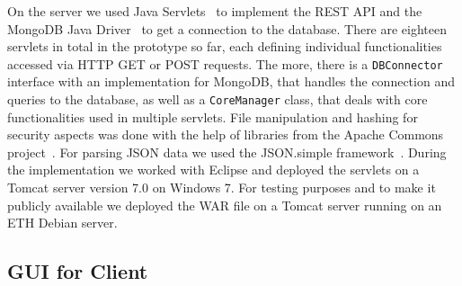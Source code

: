 On the server we used Java Servlets~\cite{JavaServlets} to implement the REST API and the MongoDB Java Driver~\cite{mongoJavaDriver} to get a connection to the database. There are eighteen servlets in total in the prototype so far, each defining individual functionalities accessed via HTTP GET or POST requests. The more, there is a \verb+DBConnector+ interface with an implementation for MongoDB, that handles the connection and queries to the database, as well as a \verb+CoreManager+ class, that deals with core functionalities used in multiple servlets. File manipulation and hashing for security aspects was done with the help of libraries from the Apache Commons project~\cite{apachecommons}. For parsing JSON data we used the JSON.simple framework~\cite{jsonsimple}. During the implementation we worked with Eclipse and deployed the servlets on a Tomcat server version 7.0 on Windows 7. For testing purposes and to make it publicly available we deployed the WAR file on a Tomcat server running on an ETH Debian server.

\subsection{GUI for Client}

